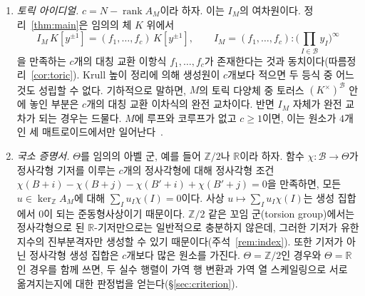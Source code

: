 \documentclass[11pt,a4paper]{article}
\theoremstyle{plain}
\theoremstyle{definition}
\newcommand{\R}{\mathbb R}
\newcommand{\Z}{\mathbb Z}
\newcommand{\AM}{A_M}
\newcommand{\kerZ}{\ker_{\Z}\!A_M}
\newcommand{\bs}{\mathcal B}
\newcommand{\rank}{\operatorname{rank}}
\begin{document}
\begin{enumerate}[label=(\roman*),leftmargin=2em,itemsep=2pt]
\item \emph{토릭 아이디얼.} $c=N-\rank\AM$이라 하자. 이는 $I_M$의 여차원이다. 정리~\ref{thm:main}은 임의의 체 $K$ 위에서
\[
I_M\,K[y^{\pm1}]=(f_1,\dots,f_c)\,K[y^{\pm1}],\qquad I_M=(f_1,\dots,f_c):\Big(\prod_{I\in\bs}y_I\Big)^{\infty}
\]
을 만족하는 $c$개의 대칭 교환 이항식 $f_1,\dots,f_c$가 존재한다는 것과 동치이다(따름정리~\ref{cor:toric}). Krull 높이 정리에 의해 생성원이 $c$개보다 적으면 두 등식 중 어느 것도 성립할 수 없다. 기하적으로 말하면, $M$의 토릭 다양체 중 토러스 $(K^\times)^{\bs}$ 안에 놓인 부분은 $c$개의 대칭 교환 이차식의 완전 교차이다. 반면 $I_M$ 자체가 완전 교차가 되는 경우는 드물다. $M$에 루프와 코루프가 없고 $c\ge1$이면, 이는 원소가 $4$개인 세 매트로이드에서만 일어난다~\cite{GR15}.
\item \emph{국소 증명서.} $\Theta$를 임의의 아벨 군, 예를 들어 $\Z/2$나 $\R$이라 하자. 함수 $\chi:\bs\to\Theta$가 정사각형 기저를 이루는 $c$개의 정사각형에 대해 정사각형 조건 $\chi(B+i)-\chi(B+j)-\chi(B'+i)+\chi(B'+j)=0$을 만족하면, 모든 $u\in\kerZ$에 대해 $\sum_I u_I\chi(I)=0$이다. 사상 $u\mapsto\sum_Iu_I\chi(I)$는 생성 집합에서 $0$이 되는 준동형사상이기 때문이다. $\Z/2$ 같은 꼬임 군(torsion group)에서는 정사각형으로 된 $\R$\nobreakdash-기저만으로는 일반적으로 충분하지 않은데, 그러한 기저가 유한 지수의 진부분격자만 생성할 수 있기 때문이다(주석~\ref{rem:index}). 또한 기저가 아닌 정사각형 생성 집합은 $c$개보다 많은 원소를 가진다. $\Theta=\Z/2$인 경우와 $\Theta=\R$인 경우를 함께 쓰면, 두 실수 행렬이 가역 행 변환과 가역 열 스케일링으로 서로 옮겨지는지에 대한 판정법을 얻는다(\S\ref{sec:criterion}).
\end{enumerate}
\end{document}
